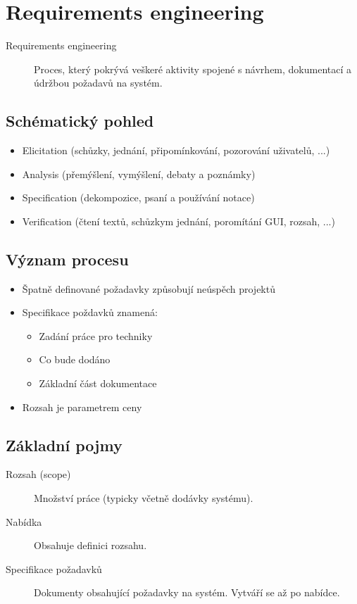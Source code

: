 \section{Requirements engineering}
  \begin{description}
    \item[Requirements engineering] Proces, který pokrývá veškeré aktivity spojené s návrhem,
    dokumentací a údržbou požadavů na systém.
  \end{description}

  \subsection{Schématický pohled}
    \begin{itemize}
      \item Elicitation (schůzky, jednání, připomínkování, pozorování uživatelů, ...)
      \item Analysis (přemýšlení, vymýšlení, debaty a poznámky)
      \item Specification (dekompozice, psaní a používání notace)
      \item Verification (čtení textů, schůzkym jednání, poromítání GUI, rozsah, ...)
    \end{itemize}

  \subsection{Význam procesu}
    \begin{itemize}
      \item Špatně definované požadavky způsobují neúspěch projektů
      \item Specifikace poždavků znamená:
        \begin{itemize}
          \item Zadání práce pro techniky
          \item Co bude dodáno
          \item Základní část dokumentace
        \end{itemize}
      \item Rozsah je parametrem ceny
    \end{itemize}

  \subsection{Základní pojmy}
    \begin{description}
      \item[Rozsah (scope)] Množství práce (typicky včetně dodávky systému).
      \item[Nabídka] Obsahuje definici rozsahu.
      \item[Specifikace požadavků] Dokumenty obsahující požadavky na systém. Vytváří se až po nabídce.
    \end{description}

